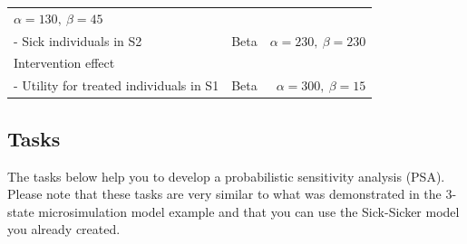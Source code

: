 \documentclass[
]{article}
\begin{document}
\begin{longtable}[]{@{}lrr@{}}
\begin{minipage}[t]{0.42\columnwidth}
\(\alpha = 130, \ \beta = 45\)\strut
\end{minipage}\tabularnewline
\begin{minipage}[t]{0.32\columnwidth}\raggedright
- Sick individuals in S2\strut
\end{minipage} & \begin{minipage}[t]{0.17\columnwidth}\raggedleft
Beta\strut
\end{minipage} & \begin{minipage}[t]{0.42\columnwidth}\raggedleft
\(\alpha = 230, \ \beta = 230\)\strut
\end{minipage}\tabularnewline
\begin{minipage}[t]{0.32\columnwidth}\raggedright
Intervention effect\strut
\end{minipage} & \begin{minipage}[t]{0.17\columnwidth}\raggedleft
\strut
\end{minipage} & \begin{minipage}[t]{0.42\columnwidth}\raggedleft
\strut
\end{minipage}\tabularnewline
\begin{minipage}[t]{0.32\columnwidth}\raggedright
- Utility for treated individuals in S1\strut
\end{minipage} & \begin{minipage}[t]{0.17\columnwidth}\raggedleft
Beta\strut
\end{minipage} & \begin{minipage}[t]{0.42\columnwidth}\raggedleft
\(\alpha = 300, \ \beta = 15\)\strut
\end{minipage}\tabularnewline
\bottomrule
\end{longtable}

\hypertarget{tasks-1}{%
\subsection{Tasks}\label{tasks-1}}

The tasks below help you to develop a probabilistic sensitivity analysis
(PSA). Please note that these tasks are very similar to what was
demonstrated in the 3-state microsimulation model example and that you
can use the Sick-Sicker model you already created.
\end{document}
